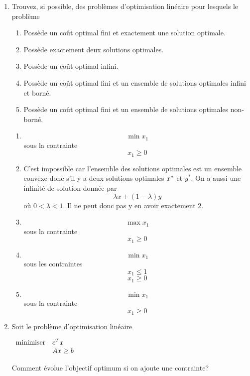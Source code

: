 \begin{enumerate}
  \item  Trouvez, si possible, des problèmes d'optimisation linéaire pour lesquels le problème

    \begin{enumerate}
      \item Poss\`ede un co\^ut optimal fini et exactement une solution optimale.
      \item Poss\`ede exactement deux solutions optimales.
      \item Possède un coût optimal infini.
      \item Possède un coût optimal fini et un ensemble de solutions optimales infini et borné.
      \item Possède un coût optimal fini et un ensemble de solutions  optimales non-borné.

    \end{enumerate}

    \begin{solution}
      \begin{enumerate}
        \item
          $$ \min x_1$$
          sous la contrainte
          $$ x_{1} \geq 0$$
        \item C'est impossible car l'ensemble des solutions optimales
          est un ensemble convexe donc s'il y a deux solutions optimales
          $x^*$ et $y^*$. On a aussi une infinité de solution donnée par
          \[ \lambda x + (1-\lambda) y \]
          où $0 < \lambda < 1$.
          Il ne peut donc pas y en avoir exactement 2.
        \item
          $$ \max x_1 $$
          sous la contrainte
          $$ x_1 \geq 0 $$
        \item
          $$ \min x_{1}$$
          sous les contraintes
          $$ x_{1} \leq 1$$
          $$ x_{1} \geq 0$$
        \item
          $$ \min x_1 $$
          sous la contrainte
          $$ x_1 \geq 0$$
      \end{enumerate}
    \end{solution}

  \item Soit le problème d'optimisation linéaire

    $
    \begin{array}{ll}
      \mbox{minimiser} &  c^T x \\
      \mbox{ }
      & A x \geq b
    \end{array}
    $

    Comment évolue l'objectif optimum si on ajoute une contrainte?


\end{enumerate}
